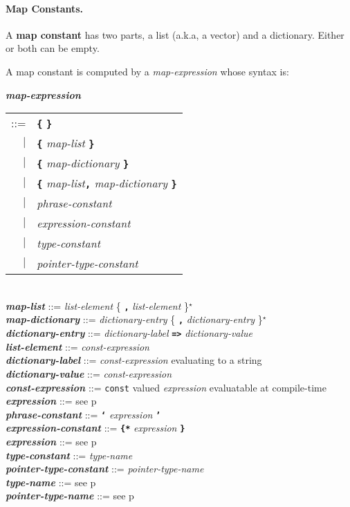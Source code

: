 \documentclass[12pt]{article}
\newcommand{\subsubsubsection}[1]{\paragraph[#1]{#1.}}
\newcommand{\TT}[1]{{\tt \bfseries #1}}
\newcommand{\STAR}{{\Large $^\star$}}
\newcommand{\key}[1]{{\rm \bfseries #1}}
\newcommand{\emkey}[1]{{\em \bfseries #1}}
\newcommand{\pagref}[1]{p\pageref{#1}}
\newenvironment{indpar}[1][0.3in]%
	{\begin{list}{}%
		     {\setlength{\itemsep}{0in}%
		      \setlength{\topsep}{0in}%
		      \setlength{\parsep}{1ex}%
		      \setlength{\labelwidth}{#1}%
		      \setlength{\leftmargin}{#1}%
		      \addtolength{\leftmargin}{\labelsep}}%
	 \item}%
	{\end{list}}
\begin{document}
\subsubsubsection{Map Constants}
\label{MAP-CONSTANTS}

A \key{map constant} has two parts, a list (a.k.a, a vector) and a dictionary.
Either or both can be empty.

A map constant is computed by a {\em map-expression} whose syntax is:

\begin{indpar}
\emkey{map-expression}\label{MAP-EXPRESSION}
    \begin{tabular}[t]{rl}
    ::= & \TT{\{} \TT{\}} \\
    $|$ & \TT{\{} {\em map-list} \TT{\}} \\
    $|$ & \TT{\{} {\em map-dictionary} \TT{\}} \\
    $|$ & \TT{\{} {\em map-list}\TT{,} {\em map-dictionary} \TT{\}} \\
    $|$ & {\em phrase-constant} \\
    $|$ & {\em expression-constant} \\
    $|$ & {\em type-constant} \\
    $|$ & {\em pointer-type-constant} \\
    \end{tabular}
\\[0.5ex]
\emkey{map-list} ::= {\em list-element} \{ \TT{,} {\em list-element} \}\STAR{}
\\[0.5ex]
\emkey{map-dictionary} ::= {\em dictionary-entry}
                              \{ \TT{,} {\em dictionary-entry} \}\STAR{}
\\[0.5ex]
\emkey{dictionary-entry} ::=
    {\em dictionary-label} \TT{=>} {\em dictionary-value}
\\[0.5ex]
\emkey{list-element}\label{LIST-ELEMENT} ::= {\em const-expression}
\\[0.5ex]
\emkey{dictionary-label}\label{DICTIONARY-LABEL}
    ::= {\em const-expression} evaluating to a string
\\[0.5ex]
\emkey{dictionary-value}\label{DICTIONARY-VALUE}
    ::= {\em const-expression}
\\[0.5ex]
\emkey{const-expression}\label{CONST-EXPRESSION}
    ::= {\tt const} valued {\em expression} evaluatable at compile-time
\\[0.5ex]
\emkey{expression} ::= see \pagref{EXPRESSION}
\\[0.5ex]
\emkey{phrase-constant} ::= \TT{`} {\em expression} \TT{'}
\\[0.5ex]
\emkey{expression-constant} ::= \TT{\{*} {\em expression} \TT{*\}}
\\[0.5ex]
\emkey{expression} ::= see \pagref{EXPRESSION}
\\[0.5ex]
\emkey{type-constant} ::= {\em type-name}
\\[0.5ex]
\emkey{pointer-type-constant} ::= {\em pointer-type-name}
\\[0.5ex]
\emkey{type-name} ::= see \pagref{TYPE-NAME}
\\[0.5ex]
\emkey{pointer-type-name} ::= see \pagref{POINTER-TYPE-NAME}
\end{indpar}
\end{document}
